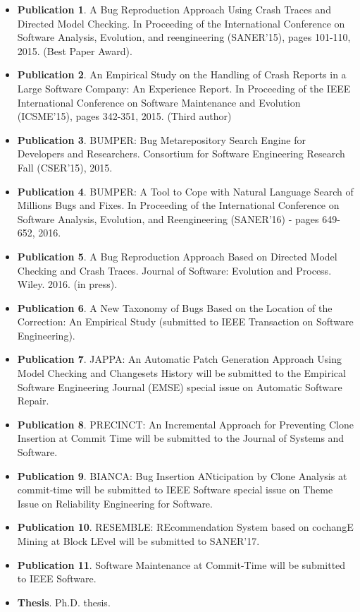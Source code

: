 \begin{itemize}
	\item {\bf Publication 1}. A Bug Reproduction Approach Using Crash Traces and Directed Model Checking. In Proceeding of the International Conference on Software Analysis, Evolution, and reengineering (SANER'15), pages 101-110, 2015. (Best Paper Award).
	\item {\bf Publication 2}. An Empirical Study on the Handling of Crash Reports in a Large Software Company: An Experience Report. In Proceeding of the IEEE International Conference on Software Maintenance and Evolution (ICSME'15), pages 342-351, 2015. (Third author)
	\item {\bf Publication 3}. BUMPER: Bug Metarepository Search Engine for Developers and Researchers. Consortium for Software Engineering Research Fall (CSER'15), 2015.
	\item {\bf Publication 4}. BUMPER: A Tool to Cope with Natural Language Search of Millions Bugs and Fixes. In Proceeding of the International Conference on Software Analysis, Evolution, and Reengineering (SANER'16) -  pages 649-652, 2016.
	\item {\bf Publication 5}.  A Bug Reproduction Approach Based on Directed Model Checking and Crash Traces. Journal of Software: Evolution and Process. Wiley. 2016. (in press).
	\item {\bf Publication 6}. A New Taxonomy of Bugs Based on the Location of the Correction: An Empirical Study (submitted to IEEE Transaction on Software Engineering).
	\item {\bf Publication 7}. JAPPA: An Automatic Patch Generation Approach Using Model Checking and Changesets History will be submitted to the Empirical Software Engineering Journal (EMSE) special issue on Automatic Software Repair.
	\item {\bf Publication 8}. PRECINCT: An Incremental Approach for Preventing Clone Insertion at Commit Time will be submitted to the Journal of Systems and Software.
	\item {\bf Publication 9}. BIANCA: Bug Insertion ANticipation by Clone Analysis at commit-time will be submitted to IEEE Software special issue on Theme Issue on Reliability Engineering for Software.
	\item {\bf Publication 10}. RESEMBLE: REcommendation System based on cochangE Mining at Block LEvel will be submitted to SANER'17.
	\item {\bf Publication 11}. Software Maintenance at Commit-Time will be submitted to IEEE Software.
	\item {\bf Thesis}.  Ph.D. thesis.
\end{itemize}

